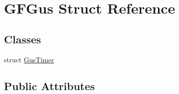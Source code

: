 \hypertarget{structGFGus}{\section{G\-F\-Gus Struct Reference}
\label{structGFGus}
}
\subsection*{Classes}
\begin{DoxyCompactItemize}
\item 
struct \hyperlink{structGFGus_1_1GusTimer}{Gus\-Timer}
\end{DoxyCompactItemize}
\subsection*{Public Attributes}
